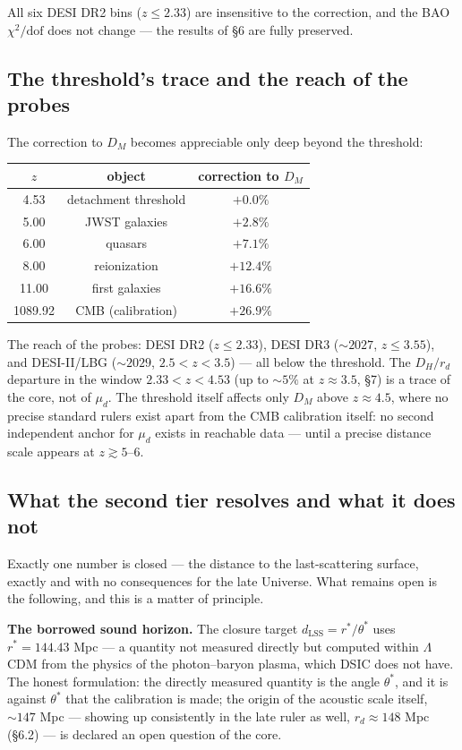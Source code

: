 \documentclass{article}
\begin{document}
All six DESI DR2 bins ($z \le 2.33$) are insensitive to the correction, and the BAO $\chi^2/\text{dof}$ does not change --- the results of \S6 are fully preserved.

\subsection{The threshold's trace and the reach of the probes}

The correction to $D_M$ becomes appreciable only deep beyond the threshold:

\begin{table}[htbp]
\centering
\small
\begin{tabular}{@{}ccc@{}}
\toprule
$z$ & object & correction to $D_M$ \\
\midrule
4.53 & detachment threshold & $+0.0\%$ \\
5.00 & JWST galaxies & $+2.8\%$ \\
6.00 & quasars & $+7.1\%$ \\
8.00 & reionization & $+12.4\%$ \\
11.00 & first galaxies & $+16.6\%$ \\
1089.92 & CMB (calibration) & $+26.9\%$ \\
\bottomrule
\end{tabular}
\end{table}

The reach of the probes: DESI DR2 ($z \le 2.33$), DESI DR3 (${\sim}2027$, $z \le 3.55$), and DESI-II/LBG (${\sim}2029$, $2.5 < z < 3.5$) --- all below the threshold. The $D_H/r_d$ departure in the window $2.33 < z < 4.53$ (up to ${\sim}5\%$ at $z \approx 3.5$, \S7) is a trace of the core, not of $\mu_d$. The threshold itself affects only $D_M$ above $z \approx 4.5$, where no precise standard rulers exist apart from the CMB calibration itself: no second independent anchor for $\mu_d$ exists in reachable data --- until a precise distance scale appears at $z \gtrsim 5\text{--}6$.

\subsection{What the second tier resolves and what it does not}

Exactly one number is closed --- the distance to the last-scattering surface, exactly and with no consequences for the late Universe. What remains open is the following, and this is a matter of principle.

\medskip
\noindent\textbf{The borrowed sound horizon.} The closure target $d_{\text{LSS}} = r^*/\theta^*$ uses $r^* = 144.43$ Mpc --- a quantity not measured directly but computed within $\Lambda$CDM from the physics of the photon--baryon plasma, which DSIC does not have. The honest formulation: the directly measured quantity is the angle $\theta^*$, and it is against $\theta^*$ that the calibration is made; the origin of the acoustic scale itself, ${\sim}147$ Mpc --- showing up consistently in the late ruler as well, $r_d \approx 148$ Mpc (\S6.2) --- is declared an open question of the core.
\end{document}
